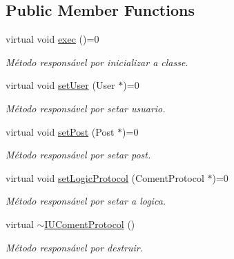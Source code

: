 \subsection*{Public Member Functions}
\begin{DoxyCompactItemize}
\item 
\hypertarget{class_i_u_coment_protocol_a202b5ccdb50cdbb4e5d91e00c0a5b36f}{virtual void \hyperlink{class_i_u_coment_protocol_a202b5ccdb50cdbb4e5d91e00c0a5b36f}{exec} ()=0}\label{class_i_u_coment_protocol_a202b5ccdb50cdbb4e5d91e00c0a5b36f}

\begin{DoxyCompactList}\small\item\em Método responsável por inicializar a classe. \end{DoxyCompactList}\item 
\hypertarget{class_i_u_coment_protocol_aaad948b88a118ea0f26cdce48211abb4}{virtual void \hyperlink{class_i_u_coment_protocol_aaad948b88a118ea0f26cdce48211abb4}{set\-User} (User $\ast$)=0}\label{class_i_u_coment_protocol_aaad948b88a118ea0f26cdce48211abb4}

\begin{DoxyCompactList}\small\item\em Método responsável por setar usuario. \end{DoxyCompactList}\item 
\hypertarget{class_i_u_coment_protocol_a5107e906127664a4fe5f0ccc884e58b1}{virtual void \hyperlink{class_i_u_coment_protocol_a5107e906127664a4fe5f0ccc884e58b1}{set\-Post} (Post $\ast$)=0}\label{class_i_u_coment_protocol_a5107e906127664a4fe5f0ccc884e58b1}

\begin{DoxyCompactList}\small\item\em Método responsável por setar post. \end{DoxyCompactList}\item 
\hypertarget{class_i_u_coment_protocol_a8ea2f52fd6f7432b6af223f86191e625}{virtual void \hyperlink{class_i_u_coment_protocol_a8ea2f52fd6f7432b6af223f86191e625}{set\-Logic\-Protocol} (Coment\-Protocol $\ast$)=0}\label{class_i_u_coment_protocol_a8ea2f52fd6f7432b6af223f86191e625}

\begin{DoxyCompactList}\small\item\em Método responsável por setar a logica. \end{DoxyCompactList}\item 
\hypertarget{class_i_u_coment_protocol_a1aadca361174f80e6b76448bc4b3f744}{virtual \hyperlink{class_i_u_coment_protocol_a1aadca361174f80e6b76448bc4b3f744}{$\sim$\-I\-U\-Coment\-Protocol} ()}\label{class_i_u_coment_protocol_a1aadca361174f80e6b76448bc4b3f744}

\begin{DoxyCompactList}\small\item\em Método responsável por destruir. \end{DoxyCompactList}\end{DoxyCompactItemize}


